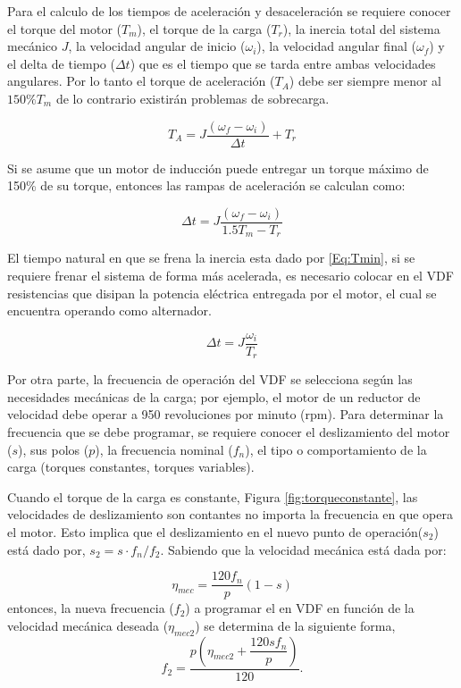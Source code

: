 Para el calculo de los  tiempos de aceleración y desaceleración se requiere conocer el torque del motor ($T_m$), el torque de la carga ($T_r$), la inercia total del sistema mecánico $J$, la velocidad angular  de inicio ($\omega_i$),  la velocidad angular final ($\omega_f$) y el delta de tiempo ($\Delta t$) que es el tiempo que se tarda entre ambas velocidades angulares. Por lo tanto el torque de aceleración ($T_A$) debe ser siempre menor al $150\% T_m$ de lo contrario existirán problemas de sobrecarga.

\begin{equation}
T_A=J\dfrac{(\omega_f-\omega_i)}{\Delta t} + T_r
\end{equation}

Si se asume que un motor de inducción  puede entregar un torque máximo de 150\% de su torque, entonces  las rampas de aceleración se calculan como:

\begin{equation}
\Delta t=J\dfrac{(\omega_f-\omega_i)}{1.5 T_m-T_r}
\end{equation}
 
 El tiempo natural en que se frena la inercia esta dado por \eqref{Eq:Tmin}, si se requiere frenar el sistema de forma más acelerada, es necesario colocar en el VDF resistencias que disipan la potencia eléctrica entregada por el motor, el cual se encuentra operando como alternador.
 
 \begin{equation}
 \Delta t=J\dfrac{\omega_i}{T_r}
 \label{Eq:Tmin}
 \end{equation}
 
 Por otra parte, la frecuencia de operación del VDF se selecciona según las necesidades mecánicas de la carga; por ejemplo, el motor de un reductor de velocidad debe operar a 950 revoluciones por minuto (rpm). Para determinar la frecuencia  que se debe programar, se requiere conocer el deslizamiento del motor ($s$), sus polos ($p$), la frecuencia nominal ($f_n$), el tipo o comportamiento de la carga (torques constantes, torques variables).
 
 Cuando el torque de la carga es constante, Figura \ref{fig:torqueconstante}, las velocidades de deslizamiento son contantes no importa la frecuencia en que opera el motor. Esto implica que el deslizamiento en el nuevo punto de operación($s_2$) está dado por, $s_2=s\cdot f_n/f_2$. Sabiendo que la velocidad mecánica está dada por:
 
 \begin{equation}
 	\eta_{mec}=\dfrac{120f_n}{p}(1-s)
\end{equation}
 entonces, la nueva frecuencia  ($f_2$) a programar el en VDF en función de la  velocidad mecánica deseada ($\eta_{mec2}$) se determina de la siguiente  forma,
 \begin{equation}
 f_2=\dfrac{p\left(\eta_{mec2}+ \dfrac{120sf_n}{p}\right) }{120}.
 \end{equation} 
 
